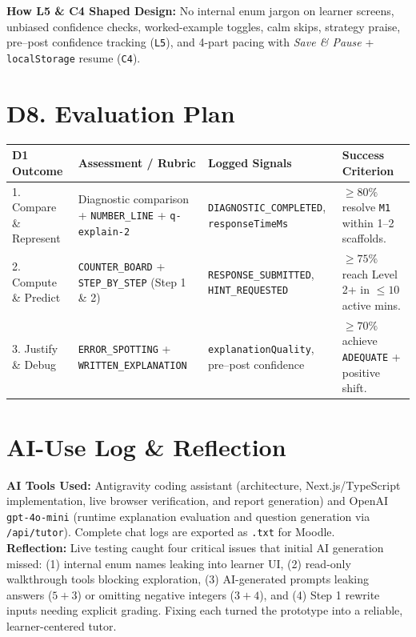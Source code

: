 \documentclass[10pt,a4paper]{article}
\begin{document}
\noindent\textbf{How L5 \& C4 Shaped Design:} No internal enum jargon on learner screens, unbiased confidence checks, worked-example toggles, calm skips, strategy praise, pre--post confidence tracking (\texttt{L5}), and 4-part pacing with \emph{Save \& Pause} + \texttt{localStorage} resume (\texttt{C4}).

\section*{D8. Evaluation Plan}
\begin{tabularx}{\linewidth}{@{}l X l X@{}}
\toprule
\textbf{D1 Outcome} & \textbf{Assessment / Rubric} & \textbf{Logged Signals} & \textbf{Success Criterion} \\
\midrule
1. Compare \& Represent & Diagnostic comparison + \texttt{NUMBER\_LINE} + \texttt{q-explain-2} & \texttt{DIAGNOSTIC\_COMPLETED}, \texttt{responseTimeMs} & $\ge 80\%$ resolve \texttt{M1} within 1--2 scaffolds. \\
2. Compute \& Predict & \texttt{COUNTER\_BOARD} + \texttt{STEP\_BY\_STEP} (Step 1 \& 2) & \texttt{RESPONSE\_SUBMITTED}, \texttt{HINT\_REQUESTED} & $\ge 75\%$ reach Level 2+ in $\le 10$ active mins. \\
3. Justify \& Debug & \texttt{ERROR\_SPOTTING} + \texttt{WRITTEN\_EXPLANATION} & \texttt{explanationQuality}, pre--post confidence & $\ge 70\%$ achieve \texttt{ADEQUATE} + positive shift. \\
\bottomrule
\end{tabularx}

\section*{AI-Use Log \& Reflection}
\textbf{AI Tools Used:} Antigravity coding assistant (architecture, Next.js/TypeScript implementation, live browser verification, and report generation) and OpenAI \texttt{gpt-4o-mini} (runtime explanation evaluation and question generation via \texttt{/api/tutor}). Complete chat logs are exported as \texttt{.txt} for Moodle.\\[4pt]
\textbf{Reflection:} Live testing caught four critical issues that initial AI generation missed: (1) internal enum names leaking into learner UI, (2) read-only walkthrough tools blocking exploration, (3) AI-generated prompts leaking answers ($5 + 3$) or omitting negative integers ($3 + 4$), and (4) Step 1 rewrite inputs needing explicit grading. Fixing each turned the prototype into a reliable, learner-centered tutor.
\end{document}
